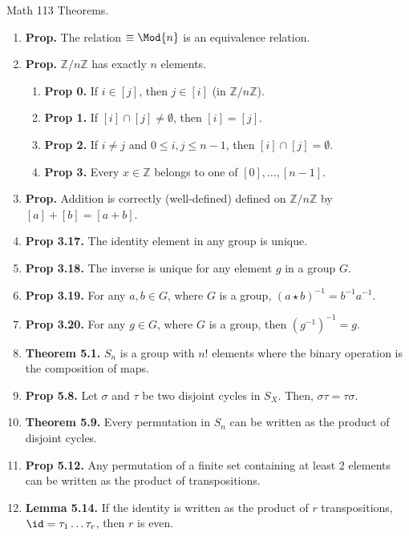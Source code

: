 

\begin{center}
    Math 113 Theorems. 
\end{center}

\begin{enumerate}
    \item \textbf{Prop. } The relation $\equiv \Mod{n}$ is an equivalence relation. 
    \item \textbf{Prop. } $\mathbb{Z}/n\mathbb{Z}$ has exactly $n$ elements. 
    \begin{enumerate}
        \item \textbf{Prop 0. } If $i \in [j]$, then $j \in [i]$ (in $\mathbb{Z}/n\mathbb{Z}$). 
        \item \textbf{Prop 1. } If $[i] \cap [j] \neq \emptyset$, then $[i]=[j]$. 
        \item \textbf{Prop 2. } If $i \neq j$ and $0 \leq i,j \leq n-1$, then $[i]\cap[j] = \emptyset$. 
        \item \textbf{Prop 3. } Every $x \in \mathbb{Z}$ belongs to one of $[0],\dots,[n-1]$. 
    \end{enumerate}
	\item \textbf{Prop. } Addition is correctly (well-defined) defined on $\mathbb{Z}/n\mathbb{Z}$ by $[a] + [b] = [a+b]$.
	\item \textbf{Prop 3.17. } The identity element in any group is unique. 
	\item \textbf{Prop 3.18. } The inverse is unique for any element $g$ in a group $G$. 
	\item \textbf{Prop 3.19. } For any $a,b \in G$, where $G$ is a group, $(a \star b)^{-1} = b^{-1}a^{-1}$. 
	\item \textbf{Prop 3.20. } For any $g \in G$, where $G$ is a group, then $(g^{-1})^{-1} = g$. 
	\item \textbf{Theorem 5.1. } $S_n$ is a group with $n!$ elements where the binary operation is the composition of maps. 
	\item \textbf{Prop 5.8. } Let $\sigma$ and $\tau$ be two disjoint cycles in $S_X$. Then, $\sigma\tau = \tau\sigma$. 
	\item \textbf{Theorem 5.9. } Every permutation in $S_n$ can be written as the product of disjoint cycles. 
	\item \textbf{Prop 5.12. } Any permutation of a finite set containing at least 2 elements can be written as the product of transpositions. 
	\item \textbf{Lemma 5.14. } If the identity is written as the product of $r$ transpositions, $\id = \tau_1\dots\tau_r$, then $r$ is even. 

\end{enumerate}
